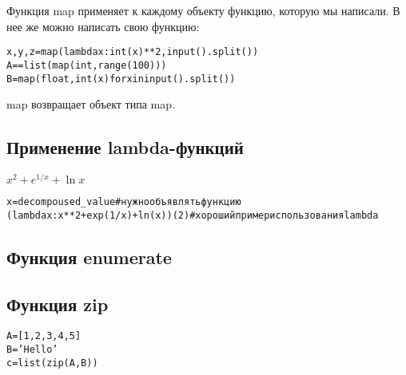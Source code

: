 Функция map применяет к каждому объекту функцию, которую мы написали. В нее же можно написать свою функцию:
\begin{alltt}
x, y, z = map(lambda x: int(x)**2, input().split())
	A == list(map(int, range(100)))
	B = map(float, int(x) for x in input().split())
\end{alltt}

map возвращает объект типа map.

\subsection{Применение lambda-функций}
$x^2+e^{1/x}+\ln x$
\begin{alltt}
x = decompoused_value # нужно объявлять функцию
(lambda x: x**2 + exp(1/x)+ln(x))(2) #хороший пример использования lambda
\end{alltt}

\subsection{Функция enumerate}
\subsection{Функция zip}

\begin{alltt}
A = [1, 2, 3, 4, 5]
B = 'Hello'
c = list(zip(A,B)) 
\end{alltt} 